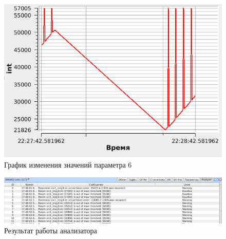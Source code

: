 \begin{figure}[H]
 \centering
 \includegraphics[scale=0.6]{tests/param_smooth/graph}
 \caption{График изменения значений параметра 6}
 \label{fig:param_smooth_graph}
\end{figure}

\begin{figure}[H]
 \centering
 \includegraphics[scale=0.4]{tests/param_smooth/report}
 \caption{Результат работы анализатора}
 \label{fig:param_smooth_report}
\end{figure}